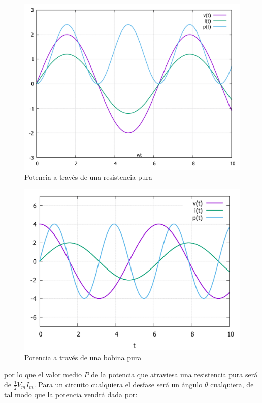 \documentclass[12pt,a4paper]{article}
\begin{document}
\begin{figure}[h!] \centering
\includegraphics[scale=0.3]{potenciaresistencia.pdf}
\caption{Potencia a través de una resistencia pura}
\end{figure}

\begin{figure}[h!] \centering
\includegraphics[scale=0.4]{potenciainduccion.pdf}
\caption{Potencia a través de una bobina pura}
\end{figure}



por lo que el valor medio $P$ de la potencia que atraviesa una resistencia pura será de $\frac{1}{2} V_m I_m$. Para un circuito cualquiera el desfase será un ángulo $\theta$ cualquiera, de tal modo que la potencia vendrá dada por:
\end{document}
